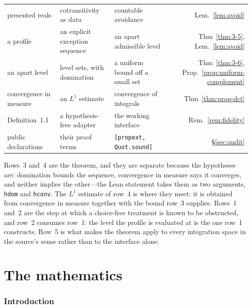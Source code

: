\documentclass[11pt]{article}
\theoremstyle{definition}
\theoremstyle{remark}
\begin{document}
\begin{center}\footnotesize
\begin{tabular}{@{}l@{\;$\to$\;}l@{\;$\to$\;}l@{\quad}r@{}}
presented reals & cotransitivity as data & countable avoidance & Lem.~\ref{lem:avoid}\\[2pt]
a profile & an explicit exception sequence & an apart admissible level & Thm~\ref{thm:3-5}, Lem.~\ref{lem:avoid}\\[2pt]
an apart level & level sets, with domination & a uniform bound off a small set & Thm~\ref{thm:3-6}, Prop.~\ref{prop:uniform-complement}\\[2pt]
convergence in measure & an $L^1$ estimate & convergence of integrals & Thm~\ref{thm:prop-dct}\\[2pt]
Definition~1.1 & a hypothesis-free adapter & the working interface & Rem.~\ref{rem:fidelity}\\[2pt]
public declarations & their proof terms & \texttt{[propext, Quot.sound]} & \S\ref{sec:audit}\\
\end{tabular}
\end{center}

Rows~3 and~4 are the theorem, and they are separate because the hypotheses are:
domination bounds the sequence, convergence in measure says it converges, and neither
implies the other---the Lean statement takes them as two arguments, \texttt{hdom} and
\texttt{hconv}.  The $L^1$ estimate of row~4 is where they meet: it is obtained from
convergence in measure together with the bound row~3 supplies.  Rows~1 and~2 are the step at which a choice-free treatment is known to
be obstructed, and row~2 consumes row~1: the level the profile is evaluated at is the
one row~1 constructs.  Row~5 is what makes the theorem apply to every integration space
in the source's sense rather than to the interface alone.

\part{The mathematics}

\section{Introduction}
\label{sec:intro}
\end{document}
